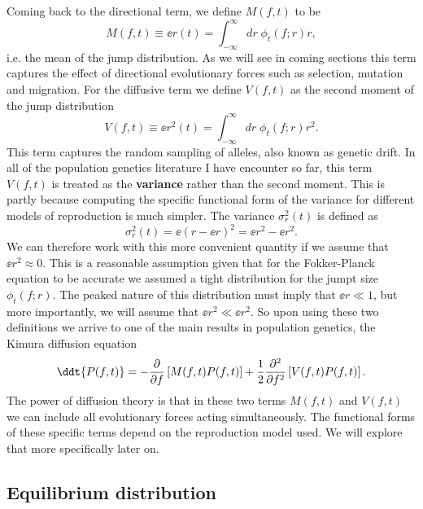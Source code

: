 Coming back to the directional term, we define $M(f, t)$ to be
\begin{equation}
  M(f, t) \equiv \ee{r(t)} = \int_{-\infty}^{\infty} dr \; \phi_t(f; r) r,
\end{equation}
i.e. the mean of the jump distribution. As we will see in coming sections this
term captures the effect of directional evolutionary forces such as selection,
mutation and migration. For the diffusive term we define $V(f, t)$ as the
second moment of the jump distribution
\begin{equation}
  V(f, t) \equiv \ee{r^2(t)} = \int_{-\infty}^{\infty} dr \; \phi_t(f; r) r^2.
\end{equation}
This term captures the random sampling of alleles, also known as genetic drift.
In all of the population genetics literature I have encounter so far, this term
$V(f, t)$ is treated as the \textbf{variance} rather than the second moment.
This is partly because computing the specific functional form of the variance
for different models of reproduction is much simpler. The variance
$\sigma_r^2(t)$ is defined as
\begin{equation}
  \sigma_r^2(t) = \ee{\left( r - \ee{r} \right)^2} = \ee{r^2} - \ee{r}^2.
\end{equation}
We can therefore work with this more convenient quantity if we assume that
$\ee{r}^2 \approx 0$. This is a reasonable assumption given that for the
Fokker-Planck equation to be accurate we assumed a tight distribution for the
jumpt size $\phi_t(f; r)$. The peaked nature of this distribution must imply
that $\ee{r} \ll 1$, but more importantly, we will assume that
$\ee{r}^2 \ll \ee{r^2}$. So upon using these two definitions we arrive to one
of the main results in population genetics, the Kimura diffusion equation
\begin{equation}
  \ddt{P(f, t)} = - {\partial \over \partial f}
  \left[
  M(f, t) P(f, t)
  \right] +
  {1 \over 2}{\partial^2 \over \partial f^2}
  \left[
  V(f, t) P(f, t)
  \right].
  \label{eq_kimura_diffusion}
\end{equation}
The power of diffusion theory is that in these two terms $M(f, t)$ and $V(f,
t)$ we can include all evolutionary forces acting simultaneously. The
functional forms of these specific terms depend on the reproduction model used.
We will explore that more specifically later on.

\subsection{Equilibrium distribution}


